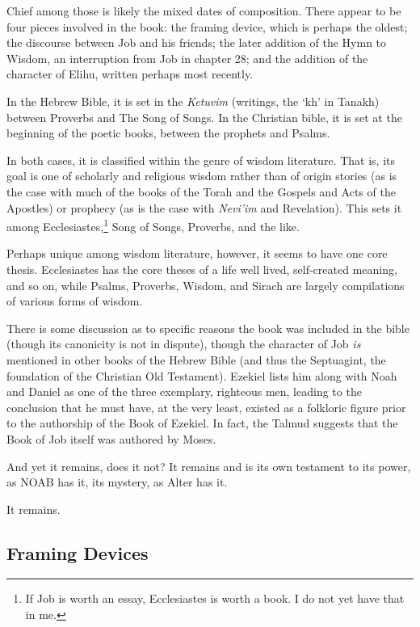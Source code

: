 Chief among those is likely the mixed dates of composition. There appear to be four pieces involved in the book: the framing device, which is perhaps the oldest; the discourse between Job and his friends; the later addition of the Hymn to Wisdom, an interruption from Job in chapter 28; and the addition of the character of Elihu, written perhaps most recently.

In the Hebrew Bible, it is set in the \emph{Ketuvim} (writings, the `kh' in Tanakh) between Proverbs and The Song of Songs. In the Christian bible, it is set at the beginning of the poetic books, between the prophets and Psalms.

In both cases, it is classified within the genre of wisdom literature. That is, its goal is one of scholarly and religious wisdom rather than of origin stories (as is the case with much of the books of the Torah and the Gospels and Acts of the Apostles) or prophecy (as is the case with \emph{Nevi'im} and Revelation). This sets it among Ecclesiastes,\footnote{If Job is worth an essay, Ecclesiastes is worth a book. I do not yet have that in me.} Song of Songs, Proverbs, and the like.

Perhaps unique among wisdom literature, however, it seems to have one core thesis. Ecclesiastes has the core theses of a life well lived, self-created meaning, and so on, while Psalms, Proverbs, Wisdom, and Sirach are largely compilations of various forms of wisdom.

There is some discussion as to specific reasons the book was included in the bible (though its canonicity is not in dispute), though the character of Job \emph{is} mentioned in other books of the Hebrew Bible (and thus the Septuagint, the foundation of the Christian Old Testament). Ezekiel lists him along with Noah and Daniel as one of the three exemplary, righteous men, leading to the conclusion that he must have, at the very least, existed as a folkloric figure prior to the authorship of the Book of Ezekiel. In fact, the Talmud suggests that the Book of Job itself was authored by Moses.

And yet it remains, does it not? It remains and is its own testament to its power, as NOAB has it, its mystery, as Alter has it.

It remains.

\hypertarget{framing-devices}{%
\subsection*{Framing Devices}\label{framing-devices}}

